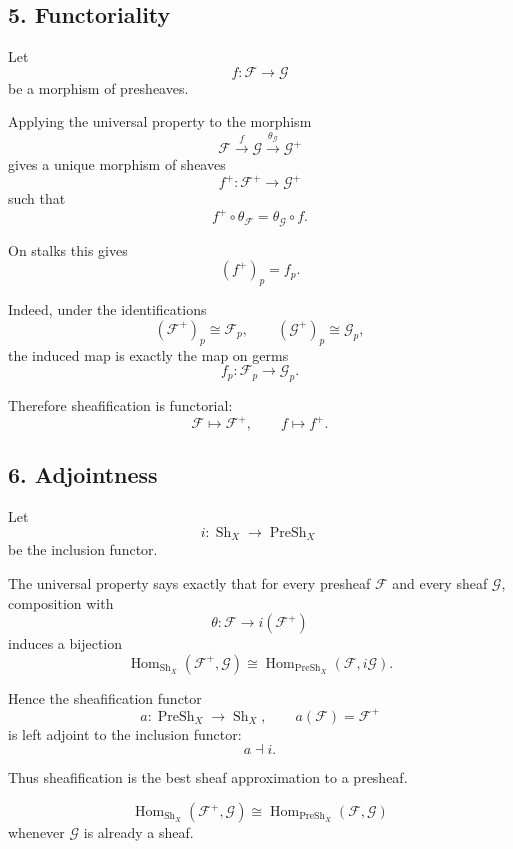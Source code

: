 \subsection*{5. Functoriality}

Let
\[
f : \mathcal F \longrightarrow \mathcal G
\]
be a morphism of presheaves.

Applying the universal property to the morphism
\[
\mathcal F \xrightarrow{f} \mathcal G
\xrightarrow{\theta_{\mathcal G}} \mathcal G^+
\]
gives a unique morphism of sheaves
\[
f^+ : \mathcal F^+ \longrightarrow \mathcal G^+
\]
such that
\[
f^+ \circ \theta_{\mathcal F}
=
\theta_{\mathcal G} \circ f.
\]

On stalks this gives
\[
(f^+)_p = f_p.
\]

Indeed, under the identifications
\[
(\mathcal F^+)_p \cong \mathcal F_p,
\qquad
(\mathcal G^+)_p \cong \mathcal G_p,
\]
the induced map is exactly the map on germs
\[
f_p : \mathcal F_p \longrightarrow \mathcal G_p.
\]

Therefore sheafification is functorial:
\[
\mathcal F \longmapsto \mathcal F^+,
\qquad
f \longmapsto f^+.
\]

\subsection*{6. Adjointness}

Let
\[
i : \operatorname{Sh}_X \longrightarrow \operatorname{PreSh}_X
\]
be the inclusion functor.

The universal property says exactly that for every presheaf $\mathcal F$ and
every sheaf $\mathcal G$, composition with
\[
\theta : \mathcal F \to i(\mathcal F^+)
\]
induces a bijection
\[
\operatorname{Hom}_{\operatorname{Sh}_X}(\mathcal F^+,\mathcal G)
\cong
\operatorname{Hom}_{\operatorname{PreSh}_X}(\mathcal F,i\mathcal G).
\]

Hence the sheafification functor
\[
a : \operatorname{PreSh}_X \longrightarrow \operatorname{Sh}_X,
\qquad
a(\mathcal F)=\mathcal F^+
\]
is left adjoint to the inclusion functor:
\[
a \dashv i.
\]

Thus sheafification is the best sheaf approximation to a presheaf.

\[
\boxed{
	\operatorname{Hom}_{\operatorname{Sh}_X}(\mathcal F^+,\mathcal G)
	\cong
	\operatorname{Hom}_{\operatorname{PreSh}_X}(\mathcal F,\mathcal G)
}
\]
whenever $\mathcal G$ is already a sheaf.

\newpage
